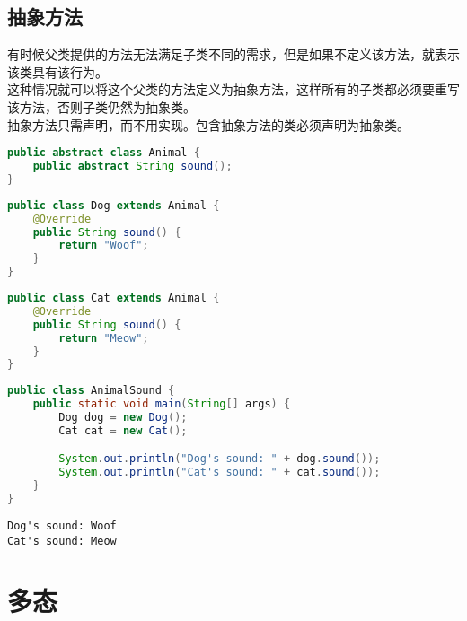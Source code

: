 \vspace{0.5cm}

\subsection{抽象方法}

有时候父类提供的方法无法满足子类不同的需求，但是如果不定义该方法，就表示该类具有该行为。\\

这种情况就可以将这个父类的方法定义为抽象方法，这样所有的子类都必须要重写该方法，否则子类仍然为抽象类。\\

抽象方法只需声明，而不用实现。包含抽象方法的类必须声明为抽象类。\\


\begin{lstlisting}[language=Java]
public abstract class Animal {
    public abstract String sound();
}
\end{lstlisting}

\begin{lstlisting}[language=Java]
public class Dog extends Animal {
    @Override
    public String sound() {
        return "Woof";
    }
}
\end{lstlisting}

\begin{lstlisting}[language=Java]
public class Cat extends Animal {
    @Override
    public String sound() {
        return "Meow";
    }
}
\end{lstlisting}

\begin{lstlisting}[language=Java]
public class AnimalSound {
    public static void main(String[] args) {
        Dog dog = new Dog();
        Cat cat = new Cat();

        System.out.println("Dog's sound: " + dog.sound());
        System.out.println("Cat's sound: " + cat.sound());
    }
}
\end{lstlisting}

\begin{tcolorbox}
    \begin{verbatim}
Dog's sound: Woof
Cat's sound: Meow
	\end{verbatim}
\end{tcolorbox}

\newpage

\section{多态}

